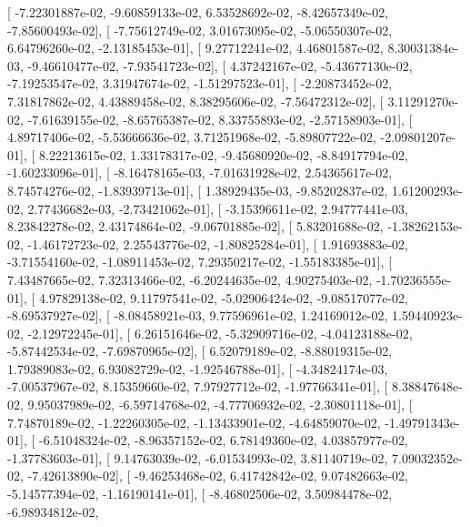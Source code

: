 \documentclass{article}
\begin{document}
       [ -7.22301887e-02,  -9.60859133e-02,   6.53528692e-02,
         -8.42657349e-02,  -7.85600493e-02],
       [ -7.75612749e-02,   3.01673095e-02,  -5.06550307e-02,
          6.64796260e-02,  -2.13185453e-01],
       [  9.27712241e-02,   4.46801587e-02,   8.30031384e-03,
         -9.46610477e-02,  -7.93541723e-02],
       [  4.37242167e-02,  -5.43677130e-02,  -7.19253547e-02,
          3.31947674e-02,  -1.51297523e-01],
       [ -2.20873452e-02,   7.31817862e-02,   4.43889458e-02,
          8.38295606e-02,  -7.56472312e-02],
       [  3.11291270e-02,  -7.61639155e-02,  -8.65765387e-02,
          8.33755893e-02,  -2.57158903e-01],
       [  4.89717406e-02,  -5.53666636e-02,   3.71251968e-02,
         -5.89807722e-02,  -2.09801207e-01],
       [  8.22213615e-02,   1.33178317e-02,  -9.45680920e-02,
         -8.84917794e-02,  -1.60233096e-01],
       [ -8.16478165e-03,  -7.01631928e-02,   2.54365617e-02,
          8.74574276e-02,  -1.83939713e-01],
       [  1.38929435e-03,  -9.85202837e-02,   1.61200293e-02,
          2.77436682e-03,  -2.73421062e-01],
       [ -3.15396611e-02,   2.94777441e-03,   8.23842278e-02,
          2.43174864e-02,  -9.06701885e-02],
       [  5.83201688e-02,  -1.38262153e-02,  -1.46172723e-02,
          2.25543776e-02,  -1.80825284e-01],
       [  1.91693883e-02,  -3.71554160e-02,  -1.08911453e-02,
          7.29350217e-02,  -1.55183385e-01],
       [  7.43487665e-02,   7.32313466e-02,  -6.20244635e-02,
          4.90275403e-02,  -1.70236555e-01],
       [  4.97829138e-02,   9.11797541e-02,  -5.02906424e-02,
         -9.08517077e-02,  -8.69537927e-02],
       [ -8.08458921e-03,   9.77596961e-02,   1.24169012e-02,
          1.59440923e-02,  -2.12972245e-01],
       [  6.26151646e-02,  -5.32909716e-02,  -4.04123188e-02,
         -5.87442534e-02,  -7.69870965e-02],
       [  6.52079189e-02,  -8.88019315e-02,   1.79389083e-02,
          6.93082729e-02,  -1.92546788e-01],
       [ -4.34824174e-03,  -7.00537967e-02,   8.15359660e-02,
          7.97927712e-02,  -1.97766341e-01],
       [  8.38847648e-02,   9.95037989e-02,  -6.59714768e-02,
         -4.77706932e-02,  -2.30801118e-01],
       [  7.74870189e-02,  -1.22260305e-02,  -1.13433901e-02,
         -4.64859070e-02,  -1.49791343e-01],
       [ -6.51048324e-02,  -8.96357152e-02,   6.78149360e-02,
          4.03857977e-02,  -1.37783603e-01],
       [  9.14763039e-02,  -6.01534993e-02,   3.81140719e-02,
          7.09032352e-02,  -7.42613890e-02],
       [ -9.46253468e-02,   6.41742842e-02,   9.07482663e-02,
         -5.14577394e-02,  -1.16190141e-01],
       [ -8.46802506e-02,   3.50984478e-02,  -6.98934812e-02,
\end{document}
